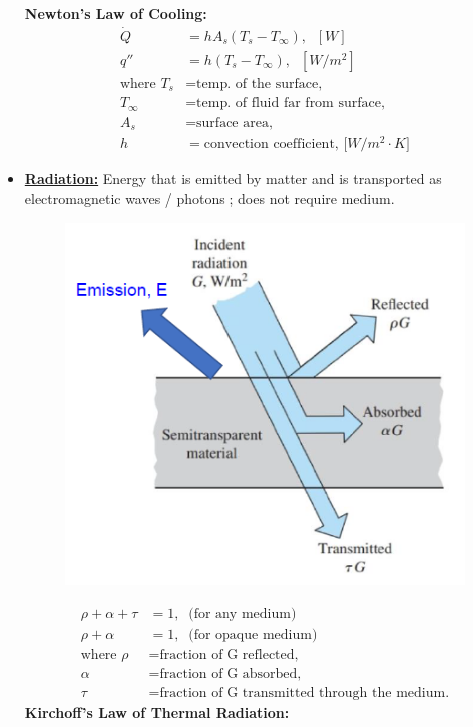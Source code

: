 \begin{itemize}
    \textbf{Newton's Law of Cooling:}
    \begin{align*}
        \dot{Q} &= h A_s (T_s - T_{\infty}), \; \; [W] \\
        q'' &= h (T_s - T_{\infty}), \; \; [W/m^2] \\
        \text{where } T_s &= \text{temp. of the surface,} \\
        T_{\infty} &= \text{temp. of fluid far from surface,} \\
        A_s &= \text{surface area,} \\
        h &= \text{convection coefficient, [$W/m^2\cdot K$]}
    \end{align*}
    \item \underline{\textbf{Radiation:}} Energy that is emitted by matter and is transported as \color{red} electromagnetic waves / photons \color{black}; does not require medium.
    \begin{figure}[h]
        \centering
        \includegraphics[width=0.75\linewidth]{images/radiation.png}
    \end{figure}
    \begin{align*}
        \rho + \alpha + \tau &= 1, \; \; \text{(for any medium)} \\
        \rho + \alpha &= 1, \; \; \text{(for opaque medium)} \\
        \text{where } \rho &= \text{fraction of G reflected,} \\
        \alpha &= \text{fraction of G absorbed,} \\
        \tau &= \text{fraction of G transmitted through the medium.}
    \end{align*}
    \textbf{Kirchoff's Law of Thermal Radiation:}

\end{itemize}
